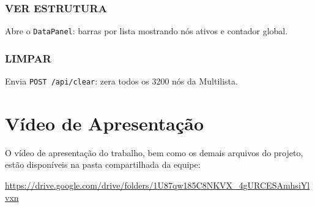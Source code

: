 \documentclass[12pt, a4paper]{article}
\begin{document}
\subsubsection{VER ESTRUTURA}
Abre o \texttt{DataPanel}: barras por lista mostrando nós ativos e contador global.

\subsubsection{LIMPAR}
Envia \texttt{POST /api/clear}: zera todos os 3200 nós da Multilista.

\section{Vídeo de Apresentação}
O vídeo de apresentação do trabalho, bem como os demais arquivos do projeto, estão disponíveis na pasta compartilhada da equipe:

\begin{center}
\url{https://drive.google.com/drive/folders/1U87qw185C8NKVX_4gURCESAmhsiYlvxn}
\end{center}
\end{document}
